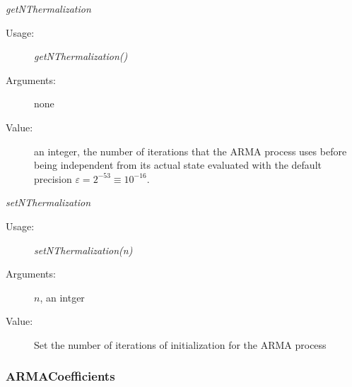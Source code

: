 \begin{description}
\begin{description}
\begin{description}
\end{description}
\bigskip

\item \textit{getNThermalization}
\begin{description}
\item[Usage:] \textit{getNThermalization()}
\item[Arguments:] none
\item[Value:] an integer, the number of iterations that the ARMA process uses before being independent from its actual state evaluated with the default precision  $\varepsilon = 2^{-53} \equiv 10^{-16}$.
\end{description}
\bigskip

\item \textit{setNThermalization}
\begin{description}
\item[Usage:] \textit{setNThermalization(n)}
\item[Arguments:] $n$, an intger
\item[Value:] Set the number of iterations of initialization for the ARMA process
\end{description}
\bigskip

\end{description}

\end{description}


\newpage
\subsubsection{ARMACoefficients}



